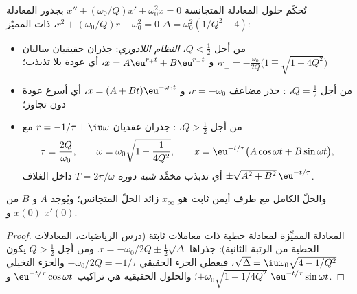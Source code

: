\begin{theorem}\label{thm:b1:transient-regimes:regimes}
تُحكَم حلول المعادلة المتجانسة $x'' + (\omega_0/Q)x' +
\omega_0^2 x = 0$ بجذور المعادلة $r^2 + (\omega_0/Q)r +
\omega_0^2 = 0$، ذات المميّز $\Delta = \omega_0^2(1/Q^2 - 4)$:
\begin{itemize}
  \item من أجل $Q < \tfrac12$، \emph{النظام اللادوري}: جذران حقيقيان سالبان
        $r_\pm = -\frac{\omega_0}{2Q}\big(1 \mp \sqrt{1 - 4Q^2}\big)$، و
        $x = A\eu^{r_+t} + B\eu^{r_-t}$، أي عودة بلا تذبذب؛
  \item من أجل $Q = \tfrac12$، \emph{}: جذر مضاعف $r = -\omega_0$، و
        $x = (A + Bt)\eu^{-\omega_0 t}$، أي أسرع عودة دون
        تجاوز؛
  \item من أجل $Q > \tfrac12$، \emph{}: جذران عقديان
        $r = -1/\tau \pm \iu\omega$ مع
        \[
        \tau = \frac{2Q}{\omega_0}, \qquad
        \omega = \omega_0\sqrt{1 - \frac{1}{4Q^2}},
        \qquad
        x = \eu^{-t/\tau}\big(A\cos\omega t + B\sin\omega t\big),
        \]
        أي تذبذب مخمَّد \emph{شبه دوره} $T = 2\pi/\omega$
        داخل الغلاف $\pm\sqrt{A^2 + B^2}\,\eu^{-t/\tau}$.
\end{itemize}
والحلّ الكامل مع طرف أيمن ثابت هو $x_\infty$ زائد
الحلّ المتجانس؛ ويُوجد $A$ و $B$ من $x(0)$ و $x'(0)$.
\end{theorem}

\begin{proof}
المعادلة المميِّزة لمعادلة خطية ذات معاملات
ثابتة (درس الرياضيات، المعادلات الخطية من الرتبة الثانية):
جذراها $r = -\omega_0/2Q \pm \tfrac12\sqrt\Delta$. ومن أجل $Q > \tfrac12$ يكون
$\sqrt\Delta = \iu\omega_0\sqrt{4 - 1/Q^2}$، فيعطي الجزء الحقيقي
$-\omega_0/2Q = -1/\tau$ والجزء التخيلي $\pm\omega_0\sqrt{1 - 1/4Q^2}$؛
والحلول الحقيقية هي تراكيب $\eu^{-t/\tau}\cos\omega t$
و $\eu^{-t/\tau}\sin\omega t$.
\end{proof}

